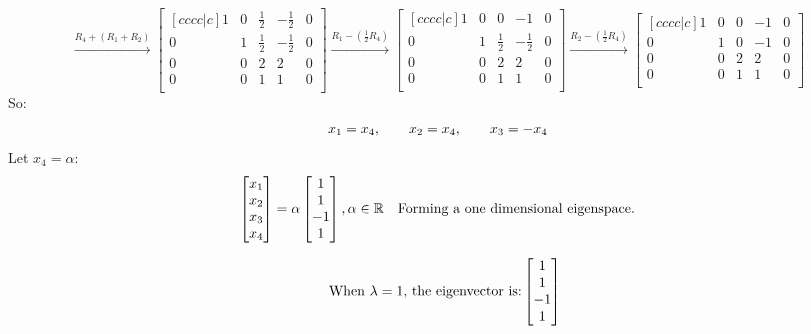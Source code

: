 \documentclass[12pt]{article}
\begin{document}
$$
\overset{R_4+(R_1+R_2)}{\longrightarrow} 
\begin{bmatrix}[cccc|c]
	1 & 0 & \frac{1}{2} & -\frac{1}{2} & 0 \\
	0 & 1 & \frac{1}{2} & -\frac{1}{2} & 0 \\
	0 & 0 & 2 & 2 & 0 \\
	0 & 0 & 1 & 1 & 0 \\
\end{bmatrix}
\overset{R_1-(\frac{1}{2}R_4)}{\longrightarrow}
\begin{bmatrix}[cccc|c]
	1 & 0 & 0 & -1 & 0 \\
	0 & 1 & \frac{1}{2} & -\frac{1}{2} & 0 \\
	0 & 0 & 2 & 2 & 0 \\
	0 & 0 & 1 & 1 & 0 \\
\end{bmatrix}
\overset{R_2-(\frac{1}{2}R_4)}{\longrightarrow}
\begin{bmatrix}[cccc|c]
	1 & 0 & 0 & -1 & 0 \\
	0 & 1 & 0 & -1 & 0 \\
	0 & 0 & 2 & 2 & 0 \\
	0 & 0 & 1 & 1 & 0 \\
\end{bmatrix}
$$
So:
$$
x_1=x_4, \hspace{20px} x_2=x_4, \hspace{20px} x_3=-x_4
$$
Let $x_4=\alpha$:
$$
\begin{bmatrix}
	x_1 \\
	x_2 \\
	x_3 \\
	x_4 \\
\end{bmatrix}
=
\alpha
\begin{bmatrix}
	1 \\
	1 \\
	-1 \\
	1 \\
\end{bmatrix},
\alpha \in \mathbb{R}
\hspace{10px}
\text{Forming a one dimensional eigenspace.}
$$

$$
\hspace{10px}
\text{When $\lambda=1$, the eigenvector is:} 
\begin{bmatrix}
	1 \\
	1 \\
	-1 \\
	1 \\
\end{bmatrix}
$$
\end{document}
